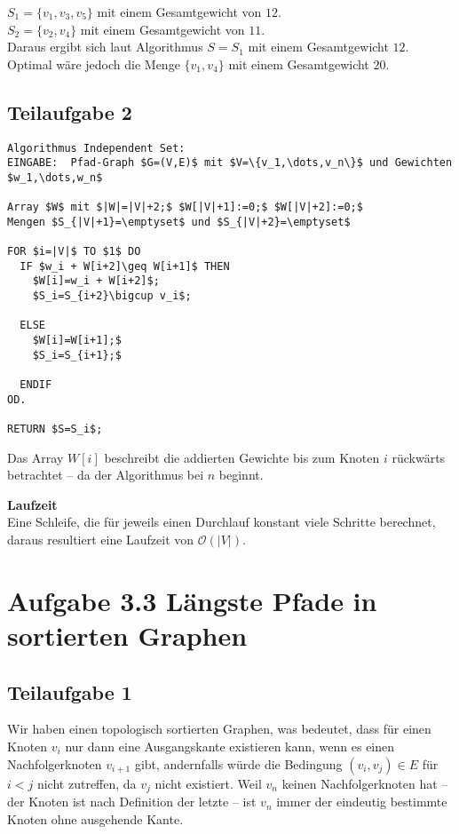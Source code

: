 \documentclass[a4paper, fontsize=10pt]{scrartcl}
\begin{document}
$S_1=\{v_1,v_3,v_5\}$ mit einem Gesamtgewicht von $12$.\\
$S_2=\{v_2,v_4\}$ mit einem Gesamtgewicht von $11$.\\Daraus ergibt sich laut Algorithmus $S=S_1$ mit einem Gesamtgewicht $12$. Optimal wäre jedoch die Menge $\{v_1,v_4\}$ mit einem Gesamtgewicht $20$.


\subsection*{Teilaufgabe 2}

\begin{lstlisting}[mathescape]
Algorithmus Independent Set:
EINGABE:  Pfad-Graph $G=(V,E)$ mit $V=\{v_1,\dots,v_n\}$ und Gewichten $w_1,\dots,w_n$

Array $W$ mit $|W|=|V|+2;$ $W[|V|+1]:=0;$ $W[|V|+2]:=0;$
Mengen $S_{|V|+1}=\emptyset$ und $S_{|V|+2}=\emptyset$
      
FOR $i=|V|$ TO $1$ DO
  IF $w_i + W[i+2]\geq W[i+1]$ THEN
    $W[i]=w_i + W[i+2]$;
    $S_i=S_{i+2}\bigcup v_i$;
    
  ELSE
    $W[i]=W[i+1];$
    $S_i=S_{i+1};$
    
  ENDIF
OD.

RETURN $S=S_i$;

\end{lstlisting}

Das Array $W[i]$ beschreibt die addierten Gewichte bis zum Knoten $i$ rückwärts betrachtet -- da der Algorithmus bei $n$ beginnt. \bigskip

\textbf{Laufzeit}\\
Eine Schleife, die für jeweils einen Durchlauf konstant viele Schritte berechnet, daraus resultiert eine Laufzeit von $\mathcal{O}(|V|)$.\bigskip

\section*{Aufgabe 3.3 Längste Pfade in sortierten Graphen}
\subsection*{Teilaufgabe 1}
Wir haben einen topologisch sortierten Graphen, was bedeutet, dass für einen Knoten $v_i$ nur dann eine Ausgangskante existieren kann, wenn es einen Nachfolgerknoten $v_{i+1}$ gibt, andernfalls würde die Bedingung $(v_i,v_j)\in E$ für $i<j$ nicht zutreffen, da $v_j$ nicht existiert. Weil $v_n$ keinen Nachfolgerknoten hat -- der Knoten ist nach Definition der letzte -- ist $v_n$ immer der eindeutig bestimmte Knoten ohne ausgehende Kante.
\end{document}

